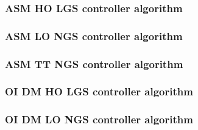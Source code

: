
\subsubsection{ASM HO LGS controller algorithm}
\subsubsection{ASM LO NGS controller algorithm}
\subsubsection{ASM TT NGS controller algorithm}
\subsubsection{OI DM HO LGS controller algorithm}
\subsubsection{OI DM LO NGS controller algorithm}

